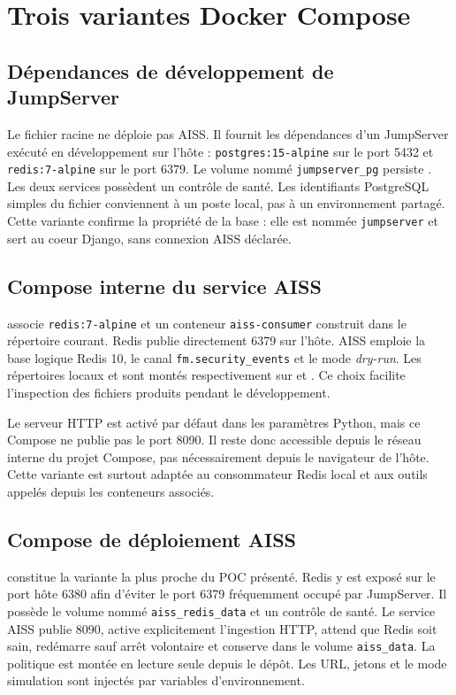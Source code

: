 \documentclass[11pt,a4paper,oneside]{report}
\theoremstyle{definition}
\theoremstyle{plain}
\begin{document}
\section{Trois variantes Docker Compose}

\subsection{Dépendances de développement de JumpServer}

Le fichier racine  ne déploie pas AISS. Il
fournit les dépendances d'un JumpServer exécuté en développement sur l'hôte :
\texttt{postgres:15-alpine} sur le port 5432 et
\texttt{redis:7-alpine} sur le port 6379. Le volume nommé
\texttt{jumpserver\_pg} persiste . Les deux
services possèdent un contrôle de santé. Les identifiants PostgreSQL simples
du fichier conviennent à un poste local, pas à un environnement partagé.
Cette variante confirme la propriété de la base : elle est nommée
\texttt{jumpserver} et sert au coeur Django, sans connexion AISS déclarée.

\subsection{Compose interne du service AISS}

 associe
\texttt{redis:7-alpine} et un conteneur \texttt{aiss-consumer} construit dans
le répertoire courant. Redis publie directement 6379 sur l'hôte. AISS emploie
la base logique Redis 10, le canal \texttt{fm.security\_events} et le mode
\emph{dry-run}. Les répertoires locaux  et  sont
montés respectivement sur  et . Ce choix
facilite l'inspection des fichiers produits pendant le développement.

Le serveur HTTP est activé par défaut dans les paramètres Python, mais ce
Compose ne publie pas le port 8090. Il reste donc accessible depuis le réseau
interne du projet Compose, pas nécessairement depuis le navigateur de l'hôte.
Cette variante est surtout adaptée au consommateur Redis local et aux outils
appelés depuis les conteneurs associés.

\subsection{Compose de déploiement AISS}

 constitue la variante la plus proche du
POC présenté. Redis y est exposé sur le port hôte 6380 afin d'éviter le port
6379 fréquemment occupé par JumpServer. Il possède le volume nommé
\texttt{aiss\_redis\_data} et un contrôle de santé. Le service AISS publie
8090, active explicitement l'ingestion HTTP, attend que Redis soit sain,
redémarre sauf arrêt volontaire et conserve  dans le volume
\texttt{aiss\_data}. La politique est montée en lecture seule depuis le
dépôt. Les URL, jetons et le mode simulation sont injectés par variables
d'environnement.
\end{document}
